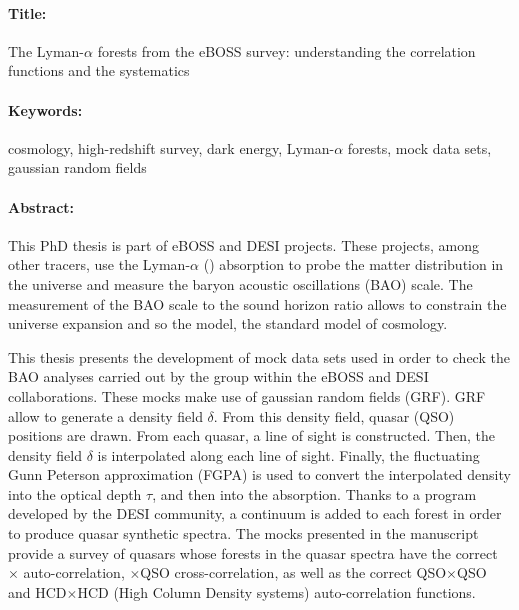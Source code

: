 \newpage
\thispagestyle{empty}
\selectfont
\begin{mdframed}[linecolor=Prune,linewidth=1]
\vspace{-.25cm}
\paragraph*{Title:} The Lyman-$\alpha$ forests from the eBOSS survey: understanding the correlation functions and the systematics

\begin{small}
\vspace{-.25cm}
\paragraph*{Keywords:} cosmology, high-redshift survey, dark energy, Lyman-$\alpha$ forests, mock data sets, gaussian random fields

\vspace{-.5cm}
\begin{multicols}{2}
  \paragraph*{Abstract:}
  This PhD thesis is part of eBOSS and DESI projects.
  These projects, among other tracers, use the Lyman-$\alpha$ (\lya) absorption to probe the matter distribution in the universe and measure the baryon acoustic oscillations (BAO) scale.
  The measurement of the BAO scale to the sound horizon ratio allows to constrain the universe expansion and so the \lcdm{} model, the standard model of cosmology.

  This thesis presents the development of mock data sets used in order to check the BAO analyses carried out by the \lya{} group within the eBOSS and DESI collaborations.
  These mocks make use of gaussian random fields (GRF).
  GRF allow to generate a density field $\delta$.
  From this density field, quasar (QSO) positions are drawn. From each quasar, a line of sight is constructed.
  Then, the density field $\delta$ is interpolated along each line of sight.
  Finally, the fluctuating Gunn Peterson approximation (FGPA) is used to convert the interpolated density into the optical depth $\tau$, and then into the \lya{} absorption.
  Thanks to a program developed by the DESI community, a continuum is added to each \lya{} forest in order to produce quasar synthetic spectra.
  The mocks presented in the manuscript provide a survey of quasars whose \lya{} forests in the quasar spectra have the correct \lya{}$\times$\lya{} auto-correlation, \lya{}$\times$QSO cross-correlation, as well as the correct QSO$\times$QSO and HCD$\times$HCD (High Column Density systems) auto-correlation functions.


\end{multicols}
\end{small}
\end{mdframed}
